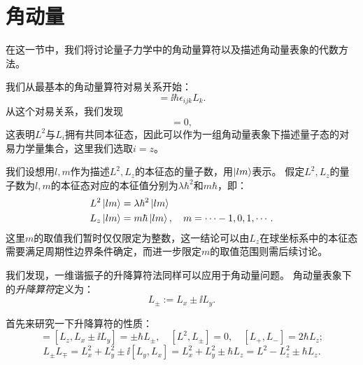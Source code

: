 \section{角动量}
\label{sec:angular_momentum}


在这一节中，我们将讨论量子力学中的角动量算符以及描述角动量表象的代数方法。

我们从最基本的角动量算符对易关系开始：
\begin{equation}
    [L_i, L_j] = \ii\hbar\epsilon_{ijk}L_k.
\end{equation}
从这个对易关系，我们发现
\begin{equation}
    [L^2, L_i] = 0,
\end{equation}
这表明$L^2$与$L_i$拥有共同本征态，因此可以作为一组角动量表象下描述量子态的对易力学量集合，这里我们选取$i=z$。

我们设想用$l,m$作为描述$L^2,L_z$的本征态的量子数，用$\ket{lm}$表示。
假定$L^2,L_z$的量子数为$l,m$的本征态对应的本征值分别为$\lambda\hbar^2$和$m\hbar$，即：
\begin{equation}
\begin{aligned}
    L^2\ket{lm} &= \lambda\hbar^2\ket{lm} \\
    L_z\ket{lm} &= m\hbar\ket{lm}, \quad m=\cdots -1, 0, 1, \cdots.
\end{aligned}
\end{equation}
这里$m$的取值我们暂时仅仅限定为整数，这一结论可以由$L_z$在球坐标系中的本征态需要满足周期性边界条件确定，而进一步限定$m$的取值范围则需后续讨论。

我们发现，一维谐振子的升降算符法同样可以应用于角动量问题。
角动量表象下的\emph{升降算符}定义为：
\begin{equation}
    L_\pm := L_x \pm \ii L_y.
\end{equation}

首先来研究一下升降算符的性质：
\begin{equation}
    [L_z, L_\pm] = [L_z, L_x \pm \ii L_y] = \pm\hbar L_\pm ,\quad
    [L^2, L_\pm] = 0, \quad
    [L_+, L_-] = 2\hbar L_z;
\end{equation}
\begin{equation}
    L_\pm L_\mp = L_x^2 + L_y^2 \pm \ii[L_y, L_x] = L_x^2 + L_y^2 \pm \hbar L_z = L^2 - L_z^2 \pm \hbar L_z.
\end{equation}

